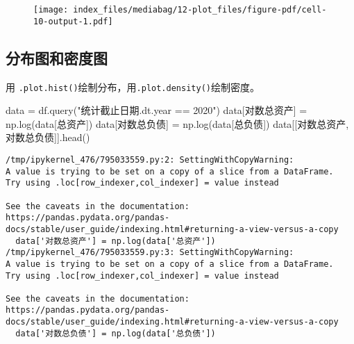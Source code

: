 \documentclass[
  letterpaper,
  DIV=11,
  numbers=noendperiod]{scrreprt}
\newenvironment{Shaded}{\begin{snugshade}}{\end{snugshade}}
\newcommand{\NormalTok}[1]{\textcolor[rgb]{0.00,0.23,0.31}{#1}}
\newcommand{\OperatorTok}[1]{\textcolor[rgb]{0.37,0.37,0.37}{#1}}
\newcommand{\StringTok}[1]{\textcolor[rgb]{0.13,0.47,0.30}{#1}}
\begin{document}
\begin{figure}[H]

{\centering \texttt{[image: index\_files/mediabag/12-plot\_files/figure-pdf/cell-10-output-1.pdf]}

}

\end{figure}

\hypertarget{ux5206ux5e03ux56feux548cux5bc6ux5ea6ux56fe}{%
\subsection{分布图和密度图}\label{ux5206ux5e03ux56feux548cux5bc6ux5ea6ux56fe}}

用 \texttt{.plot.hist()}绘制分布，用\texttt{.plot.density()}绘制密度。

\begin{Shaded}
\begin{Highlighting}[]
\NormalTok{data }\OperatorTok{=}\NormalTok{ df.query(}\StringTok{"统计截止日期.dt.year == 2020"}\NormalTok{)}
\NormalTok{data[}\StringTok{\textquotesingle{}对数总资产\textquotesingle{}}\NormalTok{] }\OperatorTok{=}\NormalTok{ np.log(data[}\StringTok{\textquotesingle{}总资产\textquotesingle{}}\NormalTok{])}
\NormalTok{data[}\StringTok{\textquotesingle{}对数总负债\textquotesingle{}}\NormalTok{] }\OperatorTok{=}\NormalTok{ np.log(data[}\StringTok{\textquotesingle{}总负债\textquotesingle{}}\NormalTok{])}
\NormalTok{data[[}\StringTok{\textquotesingle{}对数总资产\textquotesingle{}}\NormalTok{,}\StringTok{\textquotesingle{}对数总负债\textquotesingle{}}\NormalTok{]].head()}
\end{Highlighting}
\end{Shaded}

\begin{verbatim}
/tmp/ipykernel_476/795033559.py:2: SettingWithCopyWarning: 
A value is trying to be set on a copy of a slice from a DataFrame.
Try using .loc[row_indexer,col_indexer] = value instead

See the caveats in the documentation: https://pandas.pydata.org/pandas-docs/stable/user_guide/indexing.html#returning-a-view-versus-a-copy
  data['对数总资产'] = np.log(data['总资产'])
/tmp/ipykernel_476/795033559.py:3: SettingWithCopyWarning: 
A value is trying to be set on a copy of a slice from a DataFrame.
Try using .loc[row_indexer,col_indexer] = value instead

See the caveats in the documentation: https://pandas.pydata.org/pandas-docs/stable/user_guide/indexing.html#returning-a-view-versus-a-copy
  data['对数总负债'] = np.log(data['总负债'])
\end{verbatim}
\end{document}
